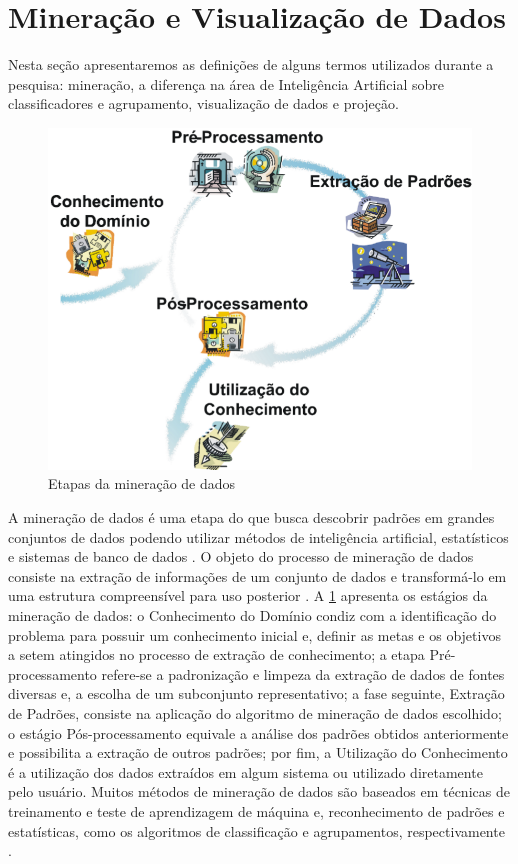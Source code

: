 	\section{Mineração e Visualização de Dados}
	\label{sec:FundTeor}
		Nesta seção apresentaremos as definições de alguns termos utilizados
		durante a pesquisa: mineração, a diferença na área de Inteligência
		Artificial sobre classificadores e agrupamento, visualização de dados e projeção.

		\begin{figure}[h]
			\centering
			\includegraphics[width=0.7\linewidth]{imagem/mineracaoDados}
			\captionsetup{justification=centering}
			\caption{Etapas da mineração de dados \cite{rezende2003}}
			\label{fig:mineracaoDados}
		\end{figure}
		
		A mineração de dados é uma etapa do 
		\cite{fayyad1996} que busca descobrir padrões em grandes conjuntos de dados
		podendo utilizar métodos de inteligência artificial, estatísticos e sistemas
		de banco de dados \cite{chakrabarti2006}. O objeto do processo de mineração
		de dados consiste na extração de informações de um conjunto de dados e
		transformá-lo em uma estrutura compreensível para uso posterior \cite{chakrabarti2006}.
		A \cref{fig:mineracaoDados} apresenta os estágios da mineração de dados:
		o Conhecimento do Domínio condiz com a identificação do problema para possuir
		um conhecimento inicial e, definir as metas e os objetivos a setem atingidos
		no processo de extração de conhecimento; a etapa Pré-processamento refere-se
		a padronização e limpeza da extração de dados de fontes diversas e, a escolha
		de um subconjunto representativo; a fase seguinte, Extração de Padrões, 
		consiste na aplicação do algoritmo de mineração de dados escolhido; o estágio
		Pós-processamento equivale a análise dos padrões obtidos anteriormente e
		possibilita a extração de outros padrões; por fim, a Utilização do Conhecimento
		é a utilização dos dados extraídos em algum sistema ou utilizado diretamente
		pelo usuário. Muitos métodos de mineração de dados são baseados em técnicas de treinamento
		e teste de aprendizagem de máquina e, reconhecimento de padrões e estatísticas,
		como os algoritmos de classificação e agrupamentos, respectivamente \cite{fayyad1996}.
		
